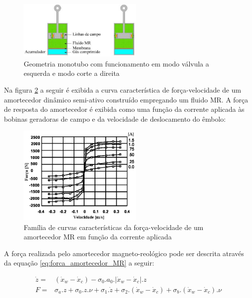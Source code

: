 \documentclass[a4paper]{ifacconf}
\begin{document}
    \FloatBarrier
    \begin{figure}[htbp]
        \begin{centering}
            \includegraphics[width=6cm]{img/amortecedor_MR_monotubo.png}
            \caption{Geometria monotubo com funcionamento em modo válvula a esquerda e modo corte a direita} 
            \label{fig:amortecedor_MR_monotubo}
        \end{centering}
    \end{figure}
    \FloatBarrier
    
    Na figura \ref{fig:curva_amortecedor_MR} a seguir é exibida a curva característica de força-velocidade de um amortecedor dinâmico semi-ativo construído empregando um fluido MR. A força de resposta do amortecedor é exibida como uma função da corrente aplicada às bobinas geradoras de campo e da velocidade de deslocamento do êmbolo:
    
    \FloatBarrier
    \begin{figure}[htbp]
        \begin{centering}
            \includegraphics[width=6cm]{img/curva_amortecedor_MR.png}
            \caption{Família de curvas características da força-velocidade de um amortecedor MR em função da corrente aplicada} 
            \label{fig:curva_amortecedor_MR}
        \end{centering}
    \end{figure}
    \FloatBarrier
    
    A força realizada pelo amortecedor magneto-reológico pode ser descrita através da equação \ref{eq:forca_amortecedor_MR} a seguir:
    
    \begin{equation} \label{eq:forca_amortecedor_MR}
    \begin{aligned}
    \dot{z}=&(\dot{x}_{w}-\dot{x}_{c})-\sigma_{0}.a_{0}.|\dot{x}_{w}-\dot{x}_{c}|.z\\ 
    F=&\sigma_{a}.z +\sigma_{0}.z.\nu+\sigma_{1}.\dot{z}+\sigma_{2}.(\dot{x}_{w}-\dot{x}_{c})+\sigma_{b}.(\dot{x}_{w}-\dot{x}_{c}).\nu
    \end{aligned}
    \end{equation}
 
\end{document}
